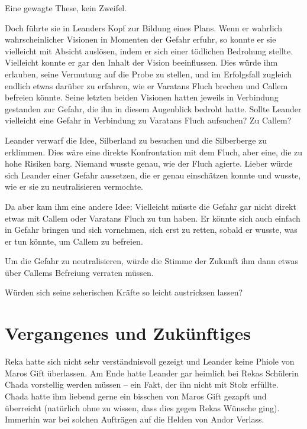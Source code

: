 Eine gewagte These, kein Zweifel.

Doch führte sie in Leanders Kopf zur Bildung eines Plans. Wenn er wahrlich wahrscheinlicher Visionen in Momenten der Gefahr erfuhr, so konnte er sie vielleicht mit Absicht auslösen, indem er sich einer tödlichen Bedrohung stellte. Vielleicht konnte er gar den Inhalt der Vision beeinflussen. Dies würde ihm erlauben, seine Vermutung auf die Probe zu stellen, und im Erfolgsfall zugleich endlich etwas darüber zu erfahren, wie er Varatans Fluch brechen und Callem befreien könnte. Seine letzten beiden Visionen hatten jeweils in Verbindung gestanden zur Gefahr, die ihn in diesem Augenblick bedroht hatte. Sollte Leander vielleicht eine Gefahr in Verbindung zu Varatans Fluch aufsuchen? Zu Callem?

Leander verwarf die Idee, Silberland zu besuchen und die Silberberge zu erklimmen. Dies wäre eine direkte Konfrontation mit dem Fluch, aber eine, die zu hohe Risiken barg. Niemand wusste genau, wie der Fluch agierte. Lieber würde sich Leander einer Gefahr aussetzen, die er genau einschätzen konnte und wusste, wie er sie zu neutralisieren vermochte.

Da aber kam ihm eine andere Idee: Vielleicht müsste die Gefahr gar nicht direkt etwas mit Callem oder Varatans Fluch zu tun haben. Er könnte sich auch einfach in Gefahr bringen und sich vornehmen, sich erst zu retten, sobald er wusste, was er tun könnte, um Callem zu befreien.

Um die Gefahr zu neutralisieren, würde die Stimme der Zukunft ihm dann etwas über Callems Befreiung verraten müssen.

Würden sich seine seherischen Kräfte so leicht austricksen lassen?







\newpage
\section{Vergangenes und Zukünftiges}



Reka hatte sich nicht sehr verständnisvoll gezeigt und Leander keine Phiole von Maros Gift überlassen. Am Ende hatte Leander gar heimlich bei Rekas Schülerin Chada vorstellig werden müssen – ein Fakt, der ihn nicht mit Stolz erfüllte. Chada hatte ihm liebend gerne ein bisschen von Maros Gift gezapft und überreicht (natürlich ohne zu wissen, dass dies gegen Rekas Wünsche ging). Immerhin war bei solchen Aufträgen auf die Helden von Andor Verlass.

